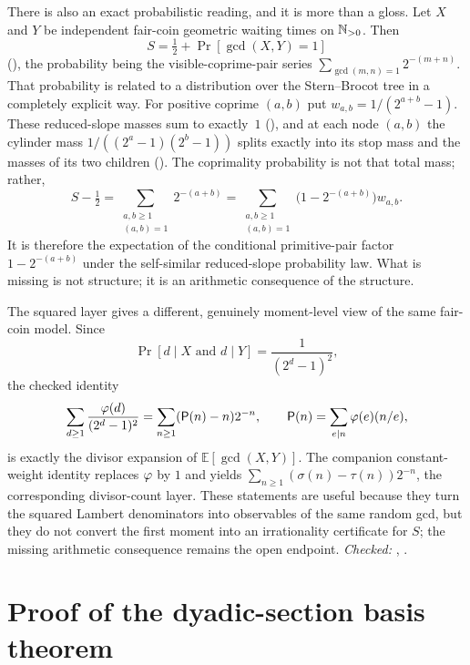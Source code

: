 \documentclass[11pt]{article}
\newcommand{\Stot}{S}
\begin{document}
There is also an exact probabilistic reading, and it is more than a gloss.
Let $X$ and $Y$ be independent fair-coin geometric waiting times on $\mathbb{N}_{>0}$.
Then
\[
  \Stot=\tfrac12+\Pr[\gcd(X,Y)=1]
\]
(),
the probability being the visible-coprime-pair series
$\sum_{\gcd(m,n)=1}2^{-(m+n)}$.  That probability is related to a distribution
over the Stern--Brocot tree in a completely explicit way.  For positive
coprime $(a,b)$ put $w_{a,b}=1/(2^{a+b}-1)$.  These reduced-slope masses sum to
exactly~$1$
(),
and at each node $(a,b)$ the cylinder mass $1/((2^a-1)(2^b-1))$ splits exactly
into its stop mass and the masses of its two children
().
The coprimality probability is not that total mass; rather,
\[
  \Stot-\tfrac12
  =\sum_{\substack{a,b\ge1\\(a,b)=1}}2^{-(a+b)}
  =\sum_{\substack{a,b\ge1\\(a,b)=1}}
     \bigl(1-2^{-(a+b)}\bigr)w_{a,b}.
\]
It is therefore the expectation of the conditional primitive-pair factor
$1-2^{-(a+b)}$ under the self-similar reduced-slope probability law.  What is
missing is not structure; it is an arithmetic consequence of the structure.

The squared layer gives a different, genuinely moment-level view of the same
fair-coin model.  Since
\[
  \Pr[d\mid X\text{ and }d\mid Y]=\frac{1}{(2^d-1)^2},
\]
the checked identity
\[
  \sum_{d\ge1}\frac{\varphi(d)}{(2^d-1)^2}
    =\sum_{n\ge1}(\mathsf P(n)-n)2^{-n},
  \qquad \mathsf P(n)=\sum_{e\mid n}\varphi(e)(n/e),
\]
is exactly the divisor expansion of $\mathbb E[\gcd(X,Y)]$.  The companion
constant-weight identity replaces $\varphi$ by $1$ and yields
$\sum_{n\ge1}(\sigma(n)-\tau(n))2^{-n}$, the corresponding divisor-count
layer.  These statements are useful because they turn the squared Lambert
denominators into observables of the same random gcd, but they do not convert
the first moment into an irrationality certificate for $\Stot$; the missing
arithmetic consequence remains the open endpoint.
{\footnotesize\emph{Checked:}
,
.}

\section{Proof of the dyadic-section basis theorem}\label{sec:rank}
\end{document}
